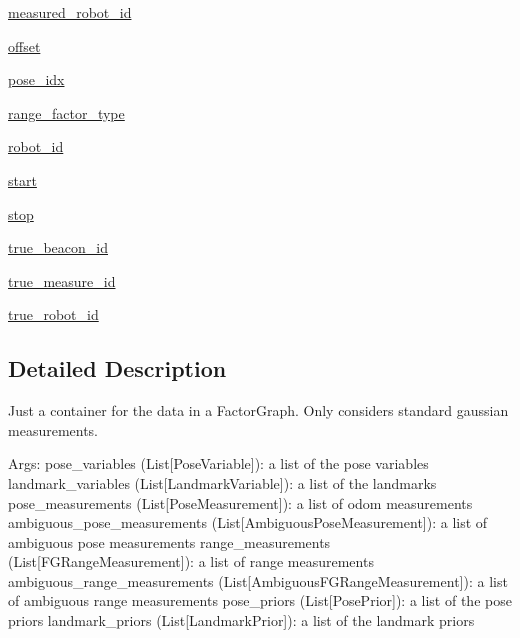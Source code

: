 \begin{DoxyCompactItemize}
\item
\hyperlink{classfactor__graph_1_1factor__graph_1_1FactorGraphData_a14c781e3c748212a00f2d88a521e5bd2}{measured\+\_\+robot\+\_\+id}
\item
\hyperlink{classfactor__graph_1_1factor__graph_1_1FactorGraphData_aa84871d99dc99b24308906ab635ea0bb}{offset}
\item
\hyperlink{classfactor__graph_1_1factor__graph_1_1FactorGraphData_a302d27b3ec4964de6826e45ceabe6d7c}{pose\+\_\+idx}
\item
\hyperlink{classfactor__graph_1_1factor__graph_1_1FactorGraphData_a215c7a7cb1717549736c2bbf857336bd}{range\+\_\+factor\+\_\+type}
\item
\hyperlink{classfactor__graph_1_1factor__graph_1_1FactorGraphData_a7deb835a7907ed1367e72d2b4ce710e3}{robot\+\_\+id}
\item
\hyperlink{classfactor__graph_1_1factor__graph_1_1FactorGraphData_a5110073ae6687779a55909624e5c1fd9}{start}
\item
\hyperlink{classfactor__graph_1_1factor__graph_1_1FactorGraphData_aa15bb1c9fb23304ab3abc5d45942f378}{stop}
\item
\hyperlink{classfactor__graph_1_1factor__graph_1_1FactorGraphData_a5448e0a88a8718f3431d029e73862950}{true\+\_\+beacon\+\_\+id}
\item
\hyperlink{classfactor__graph_1_1factor__graph_1_1FactorGraphData_ab5b115477d4ea2d511edac45515f9d33}{true\+\_\+measure\+\_\+id}
\item
\hyperlink{classfactor__graph_1_1factor__graph_1_1FactorGraphData_a44c11463c44ed3f4e2b94a5735b627fa}{true\+\_\+robot\+\_\+id}
\end{DoxyCompactItemize}


\subsection{Detailed Description}
\begin{DoxyVerb}Just a container for the data in a FactorGraph. Only considers standard
gaussian measurements.

Args:
    pose_variables (List[PoseVariable]): a list of the pose variables
    landmark_variables (List[LandmarkVariable]): a list of the landmarks
    pose_measurements (List[PoseMeasurement]): a list of odom
        measurements
    ambiguous_pose_measurements (List[AmbiguousPoseMeasurement]): a list of
        ambiguous pose measurements
    range_measurements (List[FGRangeMeasurement]): a list of range
        measurements
    ambiguous_range_measurements (List[AmbiguousFGRangeMeasurement]): a list
        of ambiguous range measurements
    pose_priors (List[PosePrior]): a list of the pose priors
    landmark_priors (List[LandmarkPrior]): a list of the landmark priors
\end{DoxyVerb}


